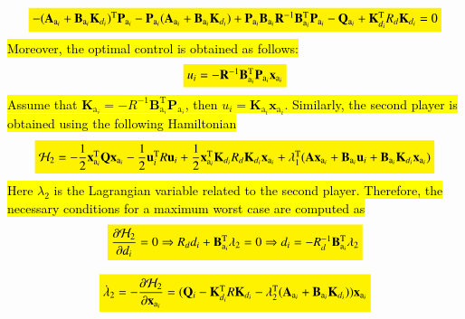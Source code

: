 \documentclass[3p]{elsarticle}
\begin{document}
    \begin{equation}\label{eq:riccatti}
        \colorbox{yellow}{$-( \mathbf{A}_{\mathrm{a}_i} + \mathbf{B}_{\mathrm{a}_i}\mathbf{K}_{d_i})^\mathrm{T} \mathbf{P}_{\mathrm{a}_i} - \mathbf{P}_{\mathrm{a}_i} (\mathbf{A}_{\mathrm{a}_i} + \mathbf{B}_{\mathrm{a}_i}\mathbf{K}_{d_i}) + \mathbf{P}_{\mathrm{a}_i} \mathbf{B}_{\mathrm{a}_i} \mathbf{R}^{-1} \mathbf{B}_{\mathrm{a}_i}^\mathrm{T} \mathbf{P}_{\mathrm{a}_i} - \mathbf{Q}_{\mathrm{a}_i}  + \mathbf{K}_{d_i}^\mathrm{T} R_{d} \mathbf{K}_{d_i} = 0$}
    \end{equation}
\hl{Moreover, the optimal control is obtained as follows:}
\begin{equation}
    \colorbox{yellow}{$u_i = -\mathbf{R}^{-1}\mathbf{B}_{\mathrm{a}_i}^\mathrm{T}\mathbf{P}_{\mathrm{a}_i}\mathbf{x}_{\mathrm{a}_i}$}
\end{equation}
\hl{Assume that $\mathbf{K}_{\mathrm{a}_i} = -R^{-1} \mathbf{B}_{\mathrm{a}_i}^\mathrm{T}\mathbf{P}_{\mathrm{a}_i}$, then $u_i = \mathbf{K}_{\mathrm{a}_i}\mathbf{x}_{\mathrm{a}_i}$. Similarly, the second player is obtained using the following Hamiltonian }
\begin{equation}
    \colorbox{yellow}{$\mathcal{H}_2 = -\dfrac{1}{2}\mathbf{x}_{\mathrm{a}_i}^\mathrm{T} \mathbf{Q} \mathbf{x}_{\mathrm{a}_i} - \dfrac{1}{2}\mathbf{u}_i^\mathrm{T} R \mathbf{u}_i + \dfrac{1}{2}\mathbf{x}_{\mathrm{a}_i}^\mathrm{T} \mathbf{K}_{d_i} R_{d} \mathbf{K}_{d_i}  \mathbf{x}_{\mathrm{a}_i} + \lambda_1^\mathrm{T}(\mathbf{A}\mathbf{x}_{\mathrm{a}_i} + \mathbf{B}_{\mathrm{a}_i}\mathbf{u}_i + \mathbf{B}_{\mathrm{a}_i}\mathbf{K}_{d_i}\mathbf{x}_{\mathrm{a}_i})$}
\end{equation}
\hl{Here $\lambda_2$ is the Lagrangian variable related to the second player. Therefore, the necessary conditions for a maximum worst case are computed as}
\begin{equation}\label{eq:Hamiltonian_d}
    \colorbox{yellow}{$\dfrac{\partial \mathcal{H}_2}{\partial d_i} = 0 \Rightarrow R_d d_i + \mathbf{B}_{\mathrm{a}_i}^\mathrm{T}\lambda_2 = 0 \Rightarrow d_i = -R_d^{-1}\mathbf{B}_{\mathrm{a}_i}^\mathrm{T}\lambda_2$}
\end{equation}

\begin{equation}\label{eq:Hamiltonian_lambda_d}
    \colorbox{yellow}{$\dot{\lambda}_2 = -\dfrac{\partial \mathcal{H}_2}{\partial \mathbf{x}_{\mathrm{a}_i}} = ( \mathbf{Q}_i - 
    \mathbf{K}_{d_i}^\mathrm{T} R \mathbf{K}_{d_i} -\lambda_2^\mathrm{T}(\mathbf{A}_{\mathrm{a}_i} + \mathbf{B}_{\mathrm{a}_i}\mathbf{K}_{d_i})) \mathbf{x}_{\mathrm{a}_i}$}
\end{equation}
\end{document}
